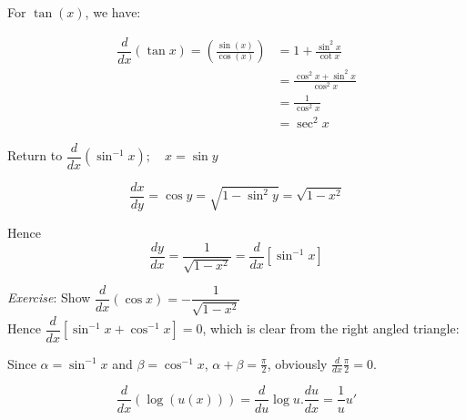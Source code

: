 \documentclass[twoside]{scrartcl}
\begin{document}
For $\tan(x)$, we have:

\[\begin{aligned}\dfrac{d}{dx}(\tan x) = \left(\frac{\sin(x)}{\cos(x)}\right)
&= 1 + \frac{\sin^2x}{\cot x}\\
&= \frac{\cos^2x + \sin^2x}{\cos^2x}\\
&= \frac{1}{\cos^2x}\\
&= \sec^2x
\end{aligned}\]

Return to $\dfrac{d}{dx}(\sin^{-1}x); \quad x = \sin y$

\[\dfrac{dx}{dy} = \cos y = \sqrt{1 - \sin^2y} = \sqrt{1 - x^2}\]

Hence \[\boxed{\dfrac{dy}{dx} = \dfrac{1}{\sqrt{1-x^2}} = \dfrac{d}{dx}[\sin^{-1}x]}\]

\emph{Exercise}: Show $\dfrac{d}{dx}(\cos x) = -\dfrac{1}{\sqrt{1-x^2}}$\\

Hence $\dfrac{d}{dx}[\sin^{-1}x + \cos^{-1}x] = 0$, which is clear from the right angled triangle: \begin{center}
	
\end{center}
Since $\alpha = \sin^{-1}x$ and $\beta = \cos^{-1}x$, $\alpha + \beta = \frac{\pi}{2}$, obviously $\frac{d}{dx} \frac{\pi}{2} = 0$.\\




\[\displaystyle{
\frac{d}{dx}(\log(u(x))) = \frac{d}{du}\log u.\frac{du}{dx} = \frac{1}{u}u'
}\]
\end{document}
